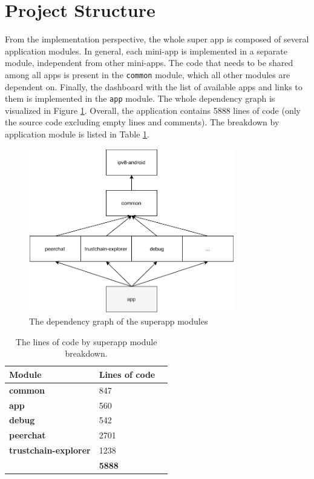 \section{Project Structure}

From the implementation perspective, the whole super app is composed of several application modules. In general, each mini-app is implemented in a separate module, independent from other mini-apps. The code that needs to be shared among all apps is present in the \texttt{common} module, which all other modules are dependent on. Finally, the dashboard with the list of available apps and links to them is implemented in the \texttt{app} module. The whole dependency graph is visualized in Figure \ref{superapp-graph}. Overall, the application contains 5888 lines of code (only the source code excluding empty lines and comments). The breakdown by application module is listed in Table \ref{superapp_loc}.

\begin{figure}
    \centering
    \includegraphics[width=0.8\textwidth]{diagrams/superapp-modules}
    \caption{The dependency graph of the superapp modules}
    \label{superapp-graph}
\end{figure}

\begin{table}[h]
    \centering
    \begin{tabular}{ | l | l | l | }
        \hline
        \textbf{Module} & \textbf{Lines of code} \\
        \hline
        \textbf{common} & 847 \\
        \textbf{app} & 560 \\
        \textbf{debug} & 542 \\
        \textbf{peerchat} & 2701 \\
        \textbf{trustchain-explorer} & 1238 \\
        \hline
        & \textbf{5888} \\
        \hline
    \end{tabular}
    \caption{The lines of code by superapp module breakdown.}
    \label{superapp_loc}
\end{table}

